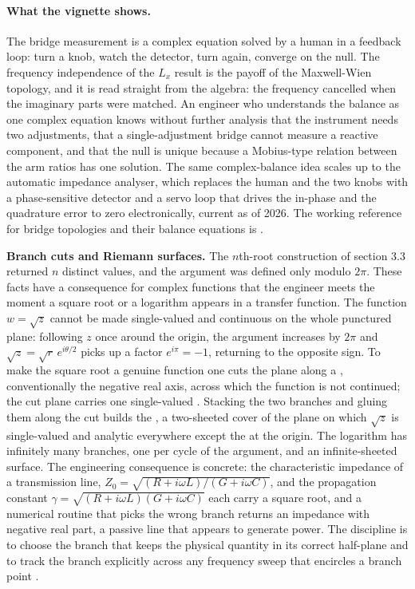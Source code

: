 \paragraph{What the vignette shows.} The bridge measurement is a
complex equation solved by a human in a feedback loop: turn a knob,
watch the detector, turn again, converge on the null. The frequency
independence of the $L_x$ result is the payoff of the Maxwell-Wien
topology, and it is read straight from the algebra: the frequency
cancelled when the imaginary parts were matched. An engineer who
understands the balance as one complex equation knows without further
analysis that the instrument needs two adjustments, that a
single-adjustment bridge cannot measure a reactive component, and that
the null is unique because a Mobius-type relation between the arm
ratios has one solution. The same complex-balance idea scales up to the
automatic impedance analyser, which replaces the human and the two
knobs with a phase-sensitive detector and a servo loop that drives the
in-phase and the quadrature error to zero electronically, current as
of 2026. The working reference for bridge topologies and their balance
equations is \cite[chapter 8]{text:v2ch03-irwin-nelms}.



\begin{mastery}
\textbf{Branch cuts and Riemann surfaces.} The $n$th-root construction of
section 3.3 returned $n$ distinct values, and the argument was defined
only modulo $2\pi$. These facts have a consequence for complex functions
that the engineer meets the moment a square root or a logarithm appears
in a transfer function. The function $w = \sqrt{z}$ cannot be made
single-valued and continuous on the whole punctured plane: following $z$
once around the origin, the argument increases by $2\pi$ and $\sqrt{z} =
\sqrt{r}\,e^{i\theta/2}$ picks up a factor $e^{i\pi} = -1$, returning to
the opposite sign. To make the square root a genuine function one cuts the
plane along a , conventionally the negative real axis,
across which the function is not continued; the cut plane carries one
single-valued . Stacking the two branches and gluing them
along the cut builds the , a two-sheeted cover of
the plane on which $\sqrt{z}$ is single-valued and analytic everywhere
except the  at the origin. The logarithm has
infinitely many branches, one per cycle of the argument, and an
infinite-sheeted surface. The engineering consequence is concrete: the
characteristic impedance of a transmission line, $Z_{0} = \sqrt{(R +
i\omega L)/(G + i\omega C)}$, and the propagation constant $\gamma =
\sqrt{(R + i\omega L)(G + i\omega C)}$ each carry a square root, and a
numerical routine that picks the wrong branch returns an impedance with
negative real part, a passive line that appears to generate power. The
discipline is to choose the branch that keeps the physical quantity in its
correct half-plane and to track the branch explicitly across any frequency
sweep that encircles a branch point \cite[chapter 7]{text:v2ch03-needham-visual-complex}.
\end{mastery}

